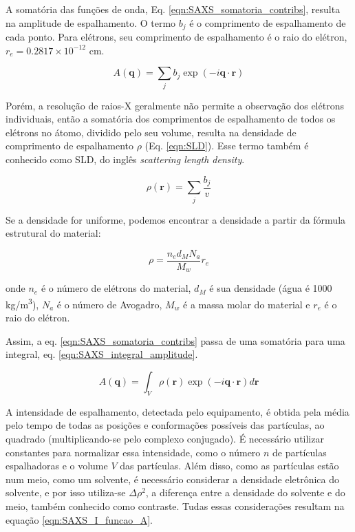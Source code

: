 		A somatória das funções de onda, Eq. \ref{eqn:SAXS_somatoria_contribs}, resulta na amplitude de espalhamento. O termo \(b_j\) é o comprimento de espalhamento de cada ponto. Para elétrons, seu comprimento de espalhamento é o raio do elétron, \(r_e = 0.2817 \times 10^{-12}\) cm.
		
		\begin{equation}
			A(\mathbf{q}) = \sum_j b_j \exp(-i \mathbf{q} \cdot \mathbf{r})
			\label{eqn:SAXS_somatoria_contribs}
		\end{equation}
		
		Porém, a resolução de raios-X geralmente não permite a observação dos elétrons individuais, então a somatória dos comprimentos de espalhamento de todos os elétrons no átomo, dividido pelo seu volume, resulta na densidade de comprimento de espalhamento \(\rho\) (Eq. \ref{eqn:SLD}). Esse termo também é conhecido como SLD, do inglês \emph{scattering length density}.
		
		\begin{equation}
			\rho(\mathbf{r}) = \sum_j \dfrac{b_j}{v}
			\label{eqn:SLD}
		\end{equation} 
		
		Se a densidade for uniforme, podemos encontrar a densidade a partir da fórmula estrutural do material:
		
		\begin{equation}
			\rho = \dfrac{n_e d_M N_a}{M_w} r_e
			\label{eqn:rho_uniforme}
		\end{equation}
		
		\noindent onde \(n_e\) é o número de elétrons do material, \(d_M\) é sua densidade (água é 1000 kg/m\textsuperscript{3}), \(N_a\) é o número de Avogadro, \(M_w\) é a massa molar do material e \(r_e\) é o raio do elétron.
		
		Assim, a eq. \ref{eqn:SAXS_somatoria_contribs} passa de uma somatória para uma integral, eq. \ref{eqn:SAXS_integral_amplitude}.
		
		\begin{equation}
			A(\mathbf{q}) = \int_V \rho(\mathbf{r}) \exp(-i \mathbf{q} \cdot \mathbf{r}) d\mathbf{r}
			\label{eqn:SAXS_integral_amplitude}
		\end{equation}
		
		A intensidade de espalhamento, detectada pelo equipamento, é obtida pela média pelo tempo de todas as posições e conformações possíveis das partículas, ao quadrado (multiplicando-se pelo complexo conjugado). É necessário utilizar constantes para normalizar essa intensidade, como o número \(n\) de partículas espalhadoras e o volume \(V\) das partículas. Além disso, como as partículas estão num meio, como um solvente, é necessário considerar a densidade eletrônica do solvente, e por isso utiliza-se \(\Delta \rho^2\), a diferença entre a densidade do solvente e do meio, também conhecido como contraste. Tudas essas considerações resultam na equação \ref{eqn:SAXS_I_funcao_A}.
		
